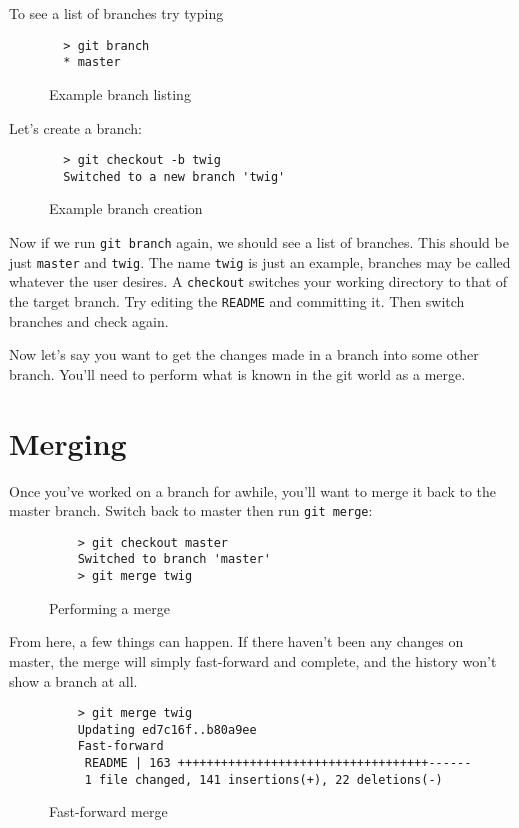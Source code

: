 \documentclass[11pt]{report}
\begin{document}
To see a list of branches try typing 
\begin{figure}[H]
  \caption{Example branch listing}
  \begin{lstlisting}
  > git branch
  * master
  \end{lstlisting}
 \end{figure}

Let's create a branch:

\begin{figure}[H]
  \caption{Example branch creation}
  \begin{lstlisting}
  > git checkout -b twig
  Switched to a new branch 'twig'
  \end{lstlisting}
\end{figure}

Now if we run \texttt{git branch} again, we should see a list of
branches. This should be just \texttt{master} and \texttt{twig}.
The name \texttt{twig} is just an example, branches may be called
whatever the user desires. A \texttt{checkout} switches your working
directory to that of the target branch. Try editing the \texttt{README}
and committing it. Then switch branches and check again.

Now let's say you want to get the changes made in a branch into some other
branch. You'll need to perform what is known in the git world as a
merge.

\section{Merging}

Once you've worked on a branch for awhile, you'll want to merge it
back to the master branch. Switch back to master then run
\texttt{git merge}:

\begin{figure}[H]
  \caption{Performing a merge}
  \begin{lstlisting}
    > git checkout master
    Switched to branch 'master'
    > git merge twig
  \end{lstlisting}
\end{figure}

From here, a few things can happen. If there haven't been any changes
on master, the merge will simply fast-forward and complete, and the
history won't show a branch at all.

\begin{figure}[H]
  \caption{Fast-forward merge}
  \begin{lstlisting}
    > git merge twig
    Updating ed7c16f..b80a9ee
    Fast-forward
     README | 163 +++++++++++++++++++++++++++++++++++------
     1 file changed, 141 insertions(+), 22 deletions(-)
  \end{lstlisting}
\end{figure}
\end{document}
